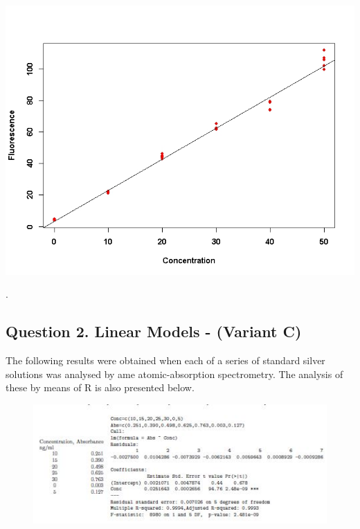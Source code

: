 \documentclass[a4paper,12pt]{article}
\begin{document}
	\begin{center}
		\includegraphics[scale=0.45]{image/ExamQ2plot2}
	\end{center}.
\newpage
\newpage

\subsection*{Question 2. Linear Models - (Variant C)}
The following results were obtained when each of a series of standard silver solutions was analysed by
ame atomic-absorption spectrometry. The analysis of these by means of R is also presented below.
\begin{figure}[h!]
\centering
\includegraphics[width=1.1\linewidth]{image/Sample1}

\end{figure}
\end{document}
